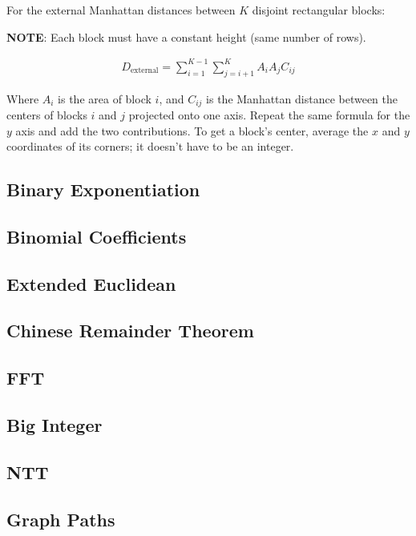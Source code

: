 \documentclass[10pt,letterpaper,landscape,twocolumn]{article}
\begin{document}
For the external Manhattan distances between $K$ disjoint rectangular blocks:

\textbf{NOTE}: Each block must have a constant height (same number of rows).

\begin{align*}
D_{\text{external}} = \sum_{i=1}^{K-1} \sum_{j=i+1}^{K} A_i A_j C_{ij}
\end{align*}

Where $A_i$ is the area of block $i$, and $C_{ij}$ is the Manhattan distance between the centers of blocks $i$ and $j$ projected onto one axis. Repeat the same formula for the $y$ axis and add the two contributions. To get a block's center, average the $x$ and $y$ coordinates of its corners; it doesn't have to be an integer.



\subsection{Binary Exponentiation}

\subsection{Binomial Coefficients}

\subsection{Extended Euclidean}

\subsection{Chinese Remainder Theorem}

\subsection{FFT}

\subsection{Big Integer}

\subsection{NTT}

\subsection{Graph Paths}

\end{document}
